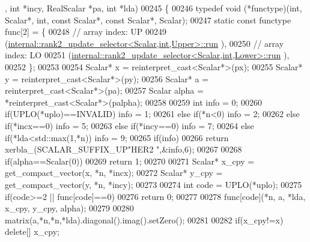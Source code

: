 \begin{DoxyCode}
      , \textcolor{keywordtype}{int} *incy, RealScalar *pa, \textcolor{keywordtype}{int} *lda)
00245 \{
00246   \textcolor{keyword}{typedef} void (*functype)(int, Scalar*, int, \textcolor{keyword}{const} Scalar*, \textcolor{keyword}{const} Scalar*, Scalar);
00247   \textcolor{keyword}{static} \textcolor{keyword}{const} functype func[2] = \{
00248     \textcolor{comment}{// array index: UP}
00249     (\hyperlink{structinternal_1_1rank2__update__selector}{internal::rank2\_update\_selector<Scalar,int,Upper>::run}
      ),
00250     \textcolor{comment}{// array index: LO}
00251     (\hyperlink{structinternal_1_1rank2__update__selector}{internal::rank2\_update\_selector<Scalar,int,Lower>::run}
      ),
00252   \};
00253 
00254   Scalar* x = \textcolor{keyword}{reinterpret\_cast<}Scalar*\textcolor{keyword}{>}(px);
00255   Scalar* y = \textcolor{keyword}{reinterpret\_cast<}Scalar*\textcolor{keyword}{>}(py);
00256   Scalar* a = \textcolor{keyword}{reinterpret\_cast<}Scalar*\textcolor{keyword}{>}(pa);
00257   Scalar alpha = *\textcolor{keyword}{reinterpret\_cast<}Scalar*\textcolor{keyword}{>}(palpha);
00258 
00259   \textcolor{keywordtype}{int} info = 0;
00260   \textcolor{keywordflow}{if}(UPLO(*uplo)==INVALID)                                            info = 1;
00261   \textcolor{keywordflow}{else} \textcolor{keywordflow}{if}(*n<0)                                                       info = 2;
00262   \textcolor{keywordflow}{else} \textcolor{keywordflow}{if}(*incx==0)                                                   info = 5;
00263   \textcolor{keywordflow}{else} \textcolor{keywordflow}{if}(*incy==0)                                                   info = 7;
00264   \textcolor{keywordflow}{else} \textcolor{keywordflow}{if}(*lda<std::max(1,*n))                                        info = 9;
00265   \textcolor{keywordflow}{if}(info)
00266     \textcolor{keywordflow}{return} xerbla\_(SCALAR\_SUFFIX\_UP\textcolor{stringliteral}{"HER2 "},&info,6);
00267 
00268   \textcolor{keywordflow}{if}(alpha==Scalar(0))
00269     \textcolor{keywordflow}{return} 1;
00270 
00271   Scalar* x\_cpy = get\_compact\_vector(x, *n, *incx);
00272   Scalar* y\_cpy = get\_compact\_vector(y, *n, *incy);
00273 
00274   \textcolor{keywordtype}{int} code = UPLO(*uplo);
00275   \textcolor{keywordflow}{if}(code>=2 || func[code]==0)
00276     \textcolor{keywordflow}{return} 0;
00277 
00278   func[code](*n, a, *lda, x\_cpy, y\_cpy, alpha);
00279 
00280   matrix(a,*n,*n,*lda).diagonal().imag().setZero();
00281 
00282   \textcolor{keywordflow}{if}(x\_cpy!=x)  \textcolor{keyword}{delete}[] x\_cpy;

\end{DoxyCode}
